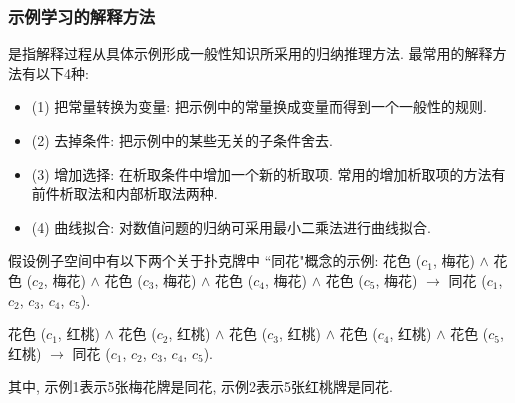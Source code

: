 \subsubsection{示例学习的解释方法}
是指解释过程从具体示例形成一般性知识所采用的归纳推理方法. 最常用的解释方法有以下4种:
\begin{itemize}
\item (1) 把常量转换为变量: 把示例中的常量换成变量而得到一个一般性的规则.

\item (2) 去掉条件: 把示例中的某些无关的子条件舍去.

\item (3) 增加选择: 在析取条件中增加一个新的析取项. 常用的增加析取项的方法有前件析取法和内部析取法两种.

\item (4) 曲线拟合: 对数值问题的归纳可采用最小二乘法进行曲线拟合.
\end{itemize}
\begin{example}
假设例子空间中有以下两个关于扑克牌中 ``同花"概念的示例:
花色 ($c_1$, 梅花) $\wedge$ 花色 ($c_2$, 梅花) $\wedge$ 花色 ($c_3$, 梅花) $\wedge$ 花色 ($c_4$, 梅花) $\wedge$ 花色 ($c_5$, 梅花) $\rightarrow$ 同花 ($c_1$, $c_2$, $c_3$, $c_4$, $c_5$).

花色 ($c_1$, 红桃) $\wedge$ 花色 ($c_2$, 红桃) $\wedge$ 花色 ($c_3$, 红桃) $\wedge$ 花色 ($c_4$, 红桃) $\wedge$ 花色 ($c_5$, 红桃) $\rightarrow$ 同花 ($c_1$, $c_2$, $c_3$, $c_4$, $c_5$).
\end{example}
其中, 示例1表示5张梅花牌是同花, 示例2表示5张红桃牌是同花.

